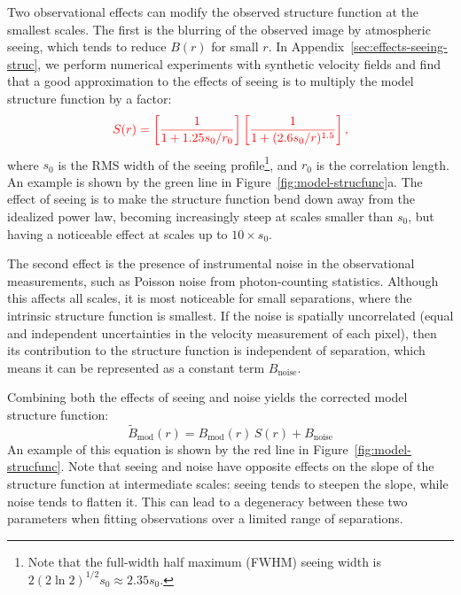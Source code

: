 \documentclass[fleqn,usenatbib, useAMS, a4paper]{mnras}
\newcommand\noise{\ensuremath{_{\text{noise}}}}
\newcommand\model{\ensuremath{_{\mathrm{mod}}}}
\begin{document}
Two observational effects can modify the observed structure function at the smallest scales.
The first is the blurring of the observed image by atmospheric seeing,
which tends to reduce \(B(r)\) for small \(r\).
In Appendix~\ref{sec:effects-seeing-struc}, we perform numerical experiments
with synthetic velocity fields and find that
a good approximation to the effects of seeing is to multiply
the model structure function by a factor:
\begin{equation}\label{eq:ffs}
  \color{red}
  S(r) =
  \left[ \frac{1}{1 + 1.25 s_0 / r_0} \right]
  \left[ \frac{1}{1 + (2.6 s_0 / r)^{1.5}} \right]
  ,
\end{equation}
where \(s_0\) is the RMS width of the seeing profile\footnote{%
  Note that the full-width half maximum (FWHM) seeing width is
  \(2 (2 \ln 2)^{1/2} s_0 \approx 2.35 s_0\).
},
and \(r_0\) is the correlation length.
An example is shown by the green line in Figure~\ref{fig:model-strucfunc}a.
The effect of seeing is to make the structure function 
bend down away from the idealized power law, 
becoming increasingly steep at scales smaller than \(s_0\),
but having a noticeable effect at scales up to \(10 \times s_0\).

The second effect is the presence of instrumental noise
in the observational measurements,
such as Poisson noise from photon-counting statistics. 
Although this affects all scales,
it is most noticeable for small separations,
where the intrinsic structure function is smallest.
If the noise is spatially uncorrelated
(equal and independent uncertainties in the velocity
measurement of each pixel),
then its contribution to the structure function is independent of separation,
which means it can be represented as a constant term \(B\noise\).

Combining both the effects of seeing and noise yields the corrected
model structure function:
\begin{equation}
  \tilde{B}\model(r) = B\model(r) \,  S(r) + B\noise
  \label{eq:sf-functional}
\end{equation}
An example of this equation is shown by the red line in Figure~\ref{fig:model-strucfunc}.
Note that seeing and noise have opposite effects on the slope
of the structure function at intermediate scales:
seeing tends to steepen the slope, while noise tends to flatten it.
This can lead to a degeneracy between these two parameters
when fitting observations over a limited range of separations.
\end{document}
